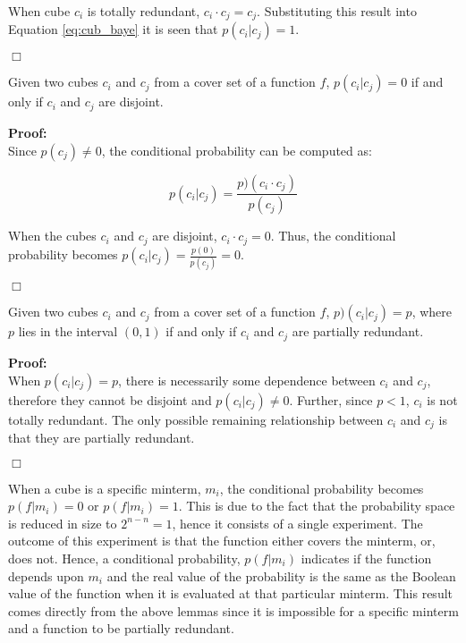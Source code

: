 When cube $c_i$ is totally redundant, $c_i \cdot c_j = c_j$.  Substituting
this result into Equation \ref{eq:cub_baye} it is seen that
$p(c_i|c_j)=1$.  

\hfill $\Box$

\begin{lemma}   \label{disjoint}
Given two cubes $c_i$ and $c_j$ from a cover set of a function $f$,
$p(c_i|c_j)=0$ if and only if $c_i$ and $c_j$ are disjoint.
\end{lemma}

\noindent
{\bf Proof:} \\
Since $p(c_j) \neq 0$, the conditional probability can be computed 
as:

\begin{equation}
p(c_i|c_j) = \frac{p)(c_i \cdot c_j)}{p(c_j)}
\end{equation}

When the cubes $c_i$ and $c_j$ are disjoint, $c_i \cdot c_j  = 0$.
Thus, the conditional probability becomes 
$p(c_i|c_j)=\frac{p(0)}{p(c_j)}=0$.

\hfill $\Box$

\begin{lemma}   \label{par_redun}
Given two cubes $c_i$ and $c_j$ from a cover set of a function $f$,
$p)(c_i|c_j)=p$, where $p$ lies in the interval $(0,1)$
if and only if $c_i$ and $c_j$ are partially redundant.
\end{lemma}

\noindent
{\bf Proof:} \\
When $p(c_i|c_j)=p$, there is necessarily some dependence between
$c_i$ and $c_j$, therefore they cannot be disjoint and $p(c_i|c_j) \neq 0$.
Further, since $p < 1$, $c_i$ is not totally redundant.  The only possible remaining
relationship between $c_i$ and $c_j$ is that they are partially redundant.

\hfill $\Box$

When a cube is a specific minterm, $m_i$, the conditional probability becomes
$p(f|m_i)=0$ or $p(f|m_i)=1$.  This is due to the
fact that the probability space is reduced in size to $2^{n-n} = 1$, hence
it consists of a single experiment.  The outcome of this experiment is that the
function either covers the minterm, or, does not.  Hence, a conditional
probability, $p(f|m_i)$ indicates if the function depends upon $m_i$ and
the real value of the probability is the same as the Boolean value of the function when it is
evaluated at that particular minterm.  This result comes directly from the above lemmas 
since it is impossible for a specific minterm and a function to be partially redundant.

